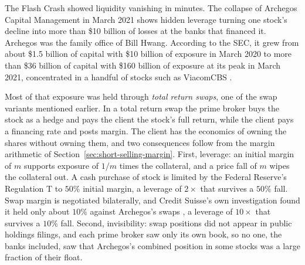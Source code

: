 \documentclass[../ai_in_finance]{subfiles}
\begin{document}
\label{sec:archegos}

The Flash Crash showed liquidity vanishing in minutes. The collapse of Archegos Capital Management in March 2021 shows hidden leverage turning one stock's decline into more than \$10 billion of losses at the banks that financed it. Archegos was the family office of Bill Hwang. According to the SEC, it grew from about \$1.5 billion of capital with \$10 billion of exposure in March 2020 to more than \$36 billion of capital with \$160 billion of exposure at its peak in March 2021, concentrated in a handful of stocks such as ViacomCBS \parencite{sec2022archegos}.

Most of that exposure was held through \emph{total return swaps}, one of the swap variants mentioned earlier. In a total return swap the prime broker buys the stock as a hedge and pays the client the stock's full return, while the client pays a financing rate and posts margin. The client has the economics of owning the shares without owning them, and two consequences follow from the margin arithmetic of Section~\ref{sec:short-selling-margin}. First, leverage: an initial margin of $m$ supports exposure of $1/m$ times the collateral, and a price fall of $m$ wipes the collateral out. A cash purchase of stock is limited by the Federal Reserve's Regulation T to $50\%$ initial margin, a leverage of $2\times$ that survives a $50\%$ fall. Swap margin is negotiated bilaterally, and Credit Suisse's own investigation found it held only about $10\%$ against Archegos's swaps \parencite{paulweiss2021archegos}, a leverage of $10\times$ that survives a $10\%$ fall. Second, invisibility: swap positions did not appear in public holdings filings, and each prime broker saw only its own book, so no one, the banks included, saw that Archegos's combined position in some stocks was a large fraction of their float.
\end{document}
